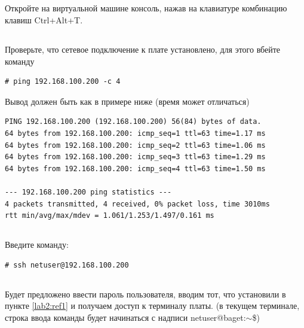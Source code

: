 \subsection{} Откройте на виртуальной машине консоль, нажав на клавиатуре комбинацию клавиш Ctrl+Alt+T. 

\subsection{} Проверьте, что сетевое подключение к плате установлено, для этого вбейте команду

\begin{lstlisting}[style=bash]
	# ping 192.168.100.200 -c 4
\end{lstlisting}

Вывод должен быть как в примере ниже (время может отличаться)

\begin{lstlisting}[style=bash]
PING 192.168.100.200 (192.168.100.200) 56(84) bytes of data.
64 bytes from 192.168.100.200: icmp_seq=1 ttl=63 time=1.17 ms
64 bytes from 192.168.100.200: icmp_seq=2 ttl=63 time=1.06 ms
64 bytes from 192.168.100.200: icmp_seq=3 ttl=63 time=1.29 ms
64 bytes from 192.168.100.200: icmp_seq=4 ttl=63 time=1.50 ms

--- 192.168.100.200 ping statistics ---
4 packets transmitted, 4 received, 0% packet loss, time 3010ms
rtt min/avg/max/mdev = 1.061/1.253/1.497/0.161 ms
\end{lstlisting}

\subsection{}\label{lab2:ref2}Введите команду: 
\begin{lstlisting}[style=bash]
# ssh netuser@192.168.100.200
\end{lstlisting}

\subsection{}Будет предложено ввести пароль пользователя, вводим тот, что установили в пункте \ref{lab2:ref1} и получаем доступ к терминалу платы. (в текущем терминале, строка ввода команды будет начинаться с надписи netuser@baget:\(\sim \)\$)

